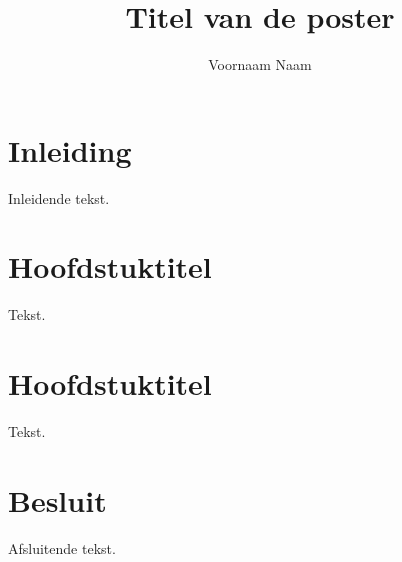 \documentclass[kulak]{kulakposter}
\title{Titel van de poster}
\institute{Naam van het vak}
\author{Voornaam Naam}
\begin{document}
\maketitle

\section*{Inleiding}
\begin{multicols}{2}\setlength{\columnseprule}{0pt}
Inleidende tekst.
\end{multicols}

\begin{multicols}{2}
\section{Hoofdstuktitel}
Tekst. \photohere

\columnbreak
\section{Hoofdstuktitel}
Tekst.
\end{multicols}

\section*{Besluit}
\begin{multicols}{2}\setlength{\columnseprule}{0pt}
Afsluitende tekst.
\end{multicols}
\end{document}
